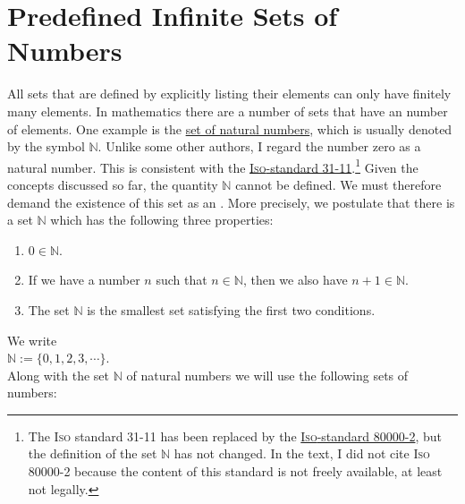 \section{Predefined Infinite Sets of Numbers}
All sets that are defined by explicitly listing their elements can only have finitely many elements.  
In mathematics there are a number of sets that have an  number of
elements.  One example is the 
\href{http://en.wikipedia.org/wiki/Natural_number}{set of natural numbers}, which is usually denoted by the symbol $\mathbb{N}$.
Unlike some other authors, I regard the number zero as a natural number.  This is consistent with the
\href{https://en.wikipedia.org/wiki/ISO_31-11}{\textsc{Iso}-standard 31-11}.\footnote{
  The \textsc{Iso} standard 31-11 has been replaced by the
  \href{https://en.wikipedia.org/wiki/ISO_80000-2}{\textsc{Iso}-standard 80000-2},
  but the definition of the set $\mathbb{N}$ has not changed.  In the text, I did not cite \textsc{Iso} 80000-2 because 
  the content of this standard is not freely available, at least not legally.
}
Given the concepts discussed so far, the quantity $\mathbb{N}$ cannot be defined.
We must therefore demand the existence of this set as an .  More precisely, we postulate that there is a
set $\mathbb{N}$ which has the following three properties:
\begin{enumerate}
\item $0 \in \mathbb{N}$.
\item If we have a number $n$ such that $n \in \mathbb{N}$, then we also have $n+1 \in \mathbb{N}$.
\item The set $\mathbb{N}$ is the smallest set satisfying the first two conditions.
\end{enumerate}
We write \\[0.2cm]
\hspace*{1.3cm} $\mathbb{N} := \{ 0, 1, 2, 3, \cdots \}$. \\[0.2cm]
Along with the set $\mathbb{N}$ of natural numbers we will use the following sets of numbers: 
